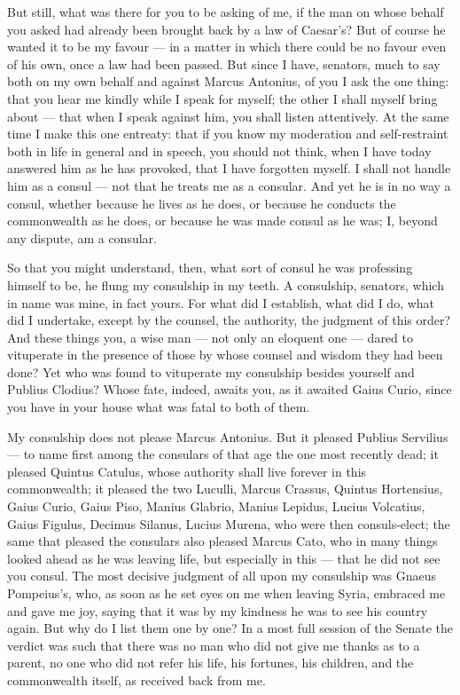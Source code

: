 But still, what was there for you to be asking of me, if the man on whose behalf you asked had already been brought back by a law of Caesar's? But of course he wanted it to be my favour --- in a matter in which there could be no favour even of his own, once a law had been passed. But since I have, senators, much to say both on my own behalf and against Marcus Antonius, of you I ask the one thing: that you hear me kindly while I speak for myself; the other I shall myself bring about --- that when I speak against him, you shall listen attentively. At the same time I make this one entreaty: that if you know my moderation and self-restraint both in life in general and in speech, you should not think, when I have today answered him as he has provoked, that I have forgotten myself. I shall not handle him as a consul --- not that he treats me as a consular. And yet he is in no way a consul, whether because he lives as he does, or because he conducts the commonwealth as he does, or because he was made consul as he was; I, beyond any dispute, am a consular.

 So that you might understand, then, what sort of consul he was professing himself to be, he flung my consulship in my teeth. A consulship, senators, which in name was mine, in fact yours. For what did I establish, what did I do, what did I undertake, except by the counsel, the authority, the judgment of this order? And these things you, a wise man --- not only an eloquent one --- dared to vituperate in the presence of those by whose counsel and wisdom they had been done? Yet who was found to vituperate my consulship besides yourself and Publius Clodius? Whose fate, indeed, awaits you, as it awaited Gaius Curio, since you have in your house what was fatal to both of them.

 My consulship does not please Marcus Antonius. But it pleased Publius Servilius --- to name first among the consulars of that age the one most recently dead; it pleased Quintus Catulus, whose authority shall live forever in this commonwealth; it pleased the two Luculli, Marcus Crassus, Quintus Hortensius, Gaius Curio, Gaius Piso, Manius Glabrio, Manius Lepidus, Lucius Volcatius, Gaius Figulus, Decimus Silanus, Lucius Murena, who were then consuls-elect; the same that pleased the consulars also pleased Marcus Cato, who in many things looked ahead as he was leaving life, but especially in this --- that he did not see you consul. The most decisive judgment of all upon my consulship was Gnaeus Pompeius's, who, as soon as he set eyes on me when leaving Syria, embraced me and gave me joy, saying that it was by my kindness he was to see his country again. But why do I list them one by one? In a most full session of the Senate the verdict was such that there was no man who did not give me thanks as to a parent, no one who did not refer his life, his fortunes, his children, and the commonwealth itself, as received back from me.

